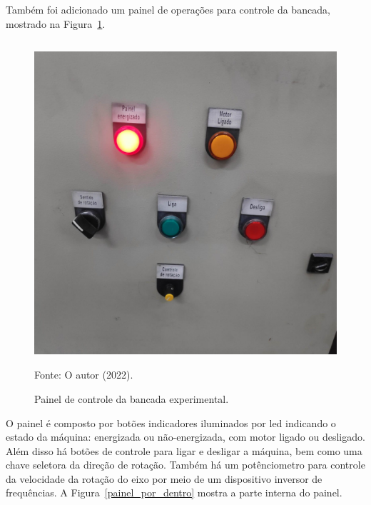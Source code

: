 \documentclass[
	12pt,				
	oneside,			
	a4paper,			
	english,			
	brazil,	
	sumario=abnt-6027-2012		
	]{abntex2ppgsi}
\begin{document}
Também foi adicionado um painel de operações para controle da bancada, mostrado na Figura~\ref{painel_bancada}. 

\begin{figure}[H]
\centering
\caption {Painel de controle da bancada experimental.}
\includegraphics[width=\textwidth,height=120mm,keepaspectratio]{painel_bancada} \\
Fonte: O autor (2022).
\label{painel_bancada}
\end{figure}
 
O painel é composto por botões indicadores iluminados por led indicando o estado da máquina: energizada ou não-energizada, com motor ligado ou desligado. Além disso há botões de controle para ligar e desligar a máquina, bem como uma chave seletora da direção de rotação. Também há um potênciometro para controle da velocidade da rotação do eixo por meio de um dispositivo inversor de frequências. A Figura~\ref{painel_por_dentro} mostra a parte interna do painel.
 
\end{document}
